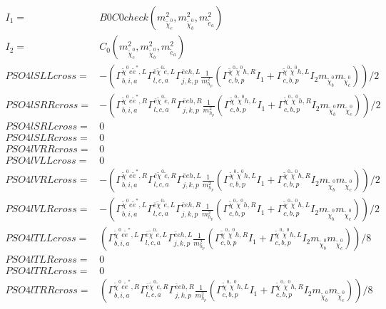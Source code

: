 \documentclass[A4,landscape]{article}
\begin{document}
\begin{align} 
I_1= & B0C0check(m^2_{\tilde{\chi}^0_{{c}}}, m^2_{\tilde{\chi}^0_{{b}}}, m^2_{\tilde{e}_{{a}}}) \\ 
I_2= & C_0(m^2_{\tilde{\chi}^0_{{c}}}, m^2_{\tilde{\chi}^0_{{b}}}, m^2_{\tilde{e}_{{a}}}) \\ 
  PSO4lSLLcross= & -( \Gamma^{\tilde{\chi}^0 e \tilde{e}^*,L}_{b, i, a} \Gamma^{\bar{e}\tilde{\chi}^0 \tilde{e} ,L}_{l, c, a} \Gamma^{\bar{e}e h ,L}_{j, k, p} \frac{1}{m^2_{h_{{p}}}} (\Gamma^{\tilde{\chi}^0 \tilde{\chi}^0 h ,R}_{c, b, p} I_1 + \Gamma^{\tilde{\chi}^0 \tilde{\chi}^0 h ,L}_{c, b, p} I_2 m_{\tilde{\chi}^0_{{b}}} m_{\tilde{\chi}^0_{{c}}}))/2 \\ 
  PSO4lSRRcross= & -( \Gamma^{\tilde{\chi}^0 e \tilde{e}^*,R}_{b, i, a} \Gamma^{\bar{e}\tilde{\chi}^0 \tilde{e} ,R}_{l, c, a} \Gamma^{\bar{e}e h ,R}_{j, k, p} \frac{1}{m^2_{h_{{p}}}} (\Gamma^{\tilde{\chi}^0 \tilde{\chi}^0 h ,L}_{c, b, p} I_1 + \Gamma^{\tilde{\chi}^0 \tilde{\chi}^0 h ,R}_{c, b, p} I_2 m_{\tilde{\chi}^0_{{b}}} m_{\tilde{\chi}^0_{{c}}}))/2 \\ 
  PSO4lSRLcross= & 0 \\ 
  PSO4lSLRcross= & 0 \\ 
  PSO4lVRRcross= & 0 \\ 
  PSO4lVLLcross= & 0 \\ 
  PSO4lVRLcross= & -( \Gamma^{\tilde{\chi}^0 e \tilde{e}^*,R}_{b, i, a} \Gamma^{\bar{e}\tilde{\chi}^0 \tilde{e} ,R}_{l, c, a} \Gamma^{\bar{e}e h ,L}_{j, k, p} \frac{1}{m^2_{h_{{p}}}} (\Gamma^{\tilde{\chi}^0 \tilde{\chi}^0 h ,L}_{c, b, p} I_1 + \Gamma^{\tilde{\chi}^0 \tilde{\chi}^0 h ,R}_{c, b, p} I_2 m_{\tilde{\chi}^0_{{b}}} m_{\tilde{\chi}^0_{{c}}}))/2 \\ 
  PSO4lVLRcross= & -( \Gamma^{\tilde{\chi}^0 e \tilde{e}^*,L}_{b, i, a} \Gamma^{\bar{e}\tilde{\chi}^0 \tilde{e} ,L}_{l, c, a} \Gamma^{\bar{e}e h ,R}_{j, k, p} \frac{1}{m^2_{h_{{p}}}} (\Gamma^{\tilde{\chi}^0 \tilde{\chi}^0 h ,R}_{c, b, p} I_1 + \Gamma^{\tilde{\chi}^0 \tilde{\chi}^0 h ,L}_{c, b, p} I_2 m_{\tilde{\chi}^0_{{b}}} m_{\tilde{\chi}^0_{{c}}}))/2 \\ 
  PSO4lTLLcross= & ( \Gamma^{\tilde{\chi}^0 e \tilde{e}^*,L}_{b, i, a} \Gamma^{\bar{e}\tilde{\chi}^0 \tilde{e} ,L}_{l, c, a} \Gamma^{\bar{e}e h ,L}_{j, k, p} \frac{1}{m^2_{h_{{p}}}} (\Gamma^{\tilde{\chi}^0 \tilde{\chi}^0 h ,R}_{c, b, p} I_1 + \Gamma^{\tilde{\chi}^0 \tilde{\chi}^0 h ,L}_{c, b, p} I_2 m_{\tilde{\chi}^0_{{b}}} m_{\tilde{\chi}^0_{{c}}}))/8 \\ 
  PSO4lTLRcross= & 0 \\ 
  PSO4lTRLcross= & 0 \\ 
  PSO4lTRRcross= & ( \Gamma^{\tilde{\chi}^0 e \tilde{e}^*,R}_{b, i, a} \Gamma^{\bar{e}\tilde{\chi}^0 \tilde{e} ,R}_{l, c, a} \Gamma^{\bar{e}e h ,R}_{j, k, p} \frac{1}{m^2_{h_{{p}}}} (\Gamma^{\tilde{\chi}^0 \tilde{\chi}^0 h ,L}_{c, b, p} I_1 + \Gamma^{\tilde{\chi}^0 \tilde{\chi}^0 h ,R}_{c, b, p} I_2 m_{\tilde{\chi}^0_{{b}}} m_{\tilde{\chi}^0_{{c}}}))/8 \\ 
\end{align} 
\end{document}
